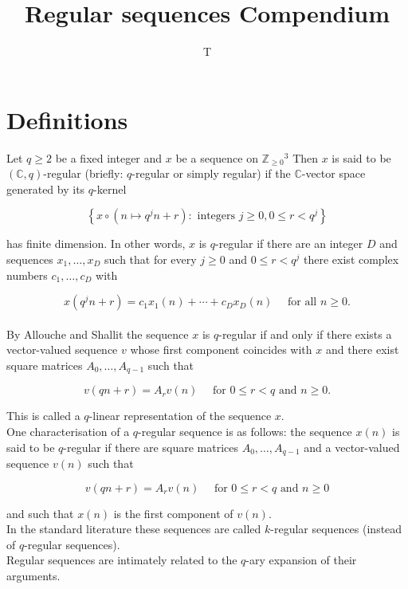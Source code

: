 \documentclass[10pt]{article}
\title{Regular sequences Compendium}
\author{T}
\date{}
\begin{document}
\maketitle

\section{Definitions}
Let $q \geq 2$ be a fixed integer and $x$ be a sequence on $\mathbb{Z}_{\geq 0}{ }^{3}$ Then $x$ is said to be $(\mathbb{C}, q)$-regular (briefly: $q$-regular or simply regular) if the $\mathbb{C}$-vector space generated by its $q$-kernel

$$
\left\{x \circ\left(n \mapsto q^{j} n+r\right): \text { integers } j \geq 0,0 \leq r<q^{j}\right\}
$$

has finite dimension. In other words, $x$ is $q$-regular if there are an integer $D$ and sequences $x_{1}, \ldots, x_{D}$ such that for every $j \geq 0$ and $0 \leq r<q^{j}$ there exist complex numbers $c_{1}, \ldots, c_{D}$ with

$$
x\left(q^{j} n+r\right)=c_{1} x_{1}(n)+\cdots+c_{D} x_{D}(n) \quad \text { for all } n \geq 0 .
$$
\\

By Allouche and Shallit the sequence $x$ is $q$-regular if and only if there exists a vector-valued sequence $v$ whose first component coincides with $x$ and there exist square matrices $A_{0}, \ldots, A_{q-1}$ such that

$$
v(q n+r)=A_{r} v(n) \quad \text { for } 0 \leq r<q \text { and } n \geq 0 .
$$

This is called a $q$-linear representation of the sequence $x$.
\\

One characterisation of a $q$-regular sequence is as follows: the sequence $x(n)$ is said to be $q$-regular if there are square matrices $A_{0}, \ldots, A_{q-1}$ and a vector-valued sequence $v(n)$ such that

$$
v(q n+r)=A_{r} v(n) \quad \text { for } 0 \leq r<q \text { and } n \geq 0
$$

and such that $x(n)$ is the first component of $v(n)$.
\\

In the standard literature these sequences are called $k$-regular sequences (instead of $q$-regular sequences).
\\

Regular sequences are intimately related to the $q$-ary expansion of their arguments.
\\
\end{document}
